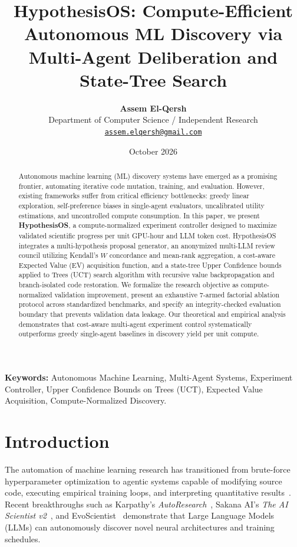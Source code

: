 \documentclass[10pt,twocolumn,3p,times]{article}
\title{\textbf{\Large HypothesisOS: Compute-Efficient Autonomous ML Discovery via Multi-Agent Deliberation and State-Tree Search}}
\author{
    \textbf{Assem El-Qersh}\\[0.5em]
    \small Department of Computer Science / Independent Research\\
    \small \href{mailto:assem.elqersh@gmail.com}{\texttt{assem.elqersh@gmail.com}}
}
\date{\small October 2026}
\begin{document}
\maketitle

\begin{abstract}
Autonomous machine learning (ML) discovery systems have emerged as a promising frontier, automating iterative code mutation, training, and evaluation. However, existing frameworks suffer from critical efficiency bottlenecks: greedy linear exploration, self-preference biases in single-agent evaluators, uncalibrated utility estimations, and uncontrolled compute consumption. In this paper, we present \textbf{HypothesisOS}, a compute-normalized experiment controller designed to maximize validated scientific progress per unit GPU-hour and LLM token cost. HypothesisOS integrates a multi-hypothesis proposal generator, an anonymized multi-LLM review council utilizing Kendall's $W$ concordance and mean-rank aggregation, a cost-aware Expected Value (EV) acquisition function, and a state-tree Upper Confidence bounds applied to Trees (UCT) search algorithm with recursive value backpropagation and branch-isolated code restoration. We formalize the research objective as compute-normalized validation improvement, present an exhaustive 7-armed factorial ablation protocol across standardized benchmarks, and specify an integrity-checked evaluation boundary that prevents validation data leakage. Our theoretical and empirical analysis demonstrates that cost-aware multi-agent experiment control systematically outperforms greedy single-agent baselines in discovery yield per unit compute.
\end{abstract}

\textbf{\small Keywords:} Autonomous Machine Learning, Multi-Agent Systems, Experiment Controller, Upper Confidence Bounds on Trees (UCT), Expected Value Acquisition, Compute-Normalized Discovery.

\section{Introduction}
\label{sec:intro}

The automation of machine learning research has transitioned from brute-force hyperparameter optimization to agentic systems capable of modifying source code, executing empirical training loops, and interpreting quantitative results~\cite{karpathy2026autoresearch, lu2024aiscientist}. Recent breakthroughs such as Karpathy's \textit{AutoResearch}~\cite{karpathy2026autoresearch}, Sakana AI's \textit{The AI Scientist v2}~\cite{lu2025aiscientistv2}, and EvoScientist~\cite{lu2026evoscientist} demonstrate that Large Language Models (LLMs) can autonomously discover novel neural architectures and training schedules.
\end{document}
